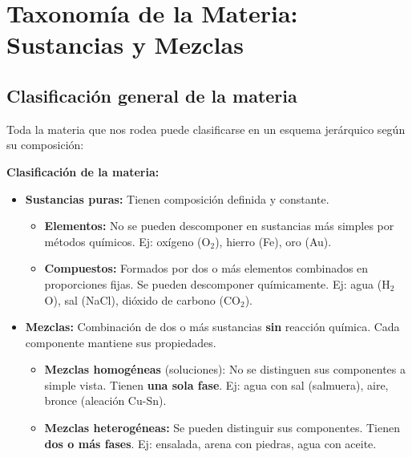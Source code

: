 \documentclass[12pt, letterpaper]{article}
\begin{document}
\section{Taxonomía de la Materia: Sustancias y Mezclas}

\subsection{Clasificación general de la materia}

Toda la materia que nos rodea puede clasificarse en un esquema jerárquico según su composición:

\begin{cuadroteoria}
  \textbf{Clasificación de la materia:}
  \begin{itemize}[leftmargin=*]
    \item \textbf{Sustancias puras:} Tienen composición definida y constante.
          \begin{itemize}
            \item \textbf{Elementos:} No se pueden descomponer en sustancias más simples por métodos químicos. Ej: oxígeno (O$_2$), hierro (Fe), oro (Au).
            \item \textbf{Compuestos:} Formados por dos o más elementos combinados en proporciones fijas. Se pueden descomponer químicamente. Ej: agua (H$_2$O), sal (NaCl), dióxido de carbono (CO$_2$).
          \end{itemize}

    \item \textbf{Mezclas:} Combinación de dos o más sustancias \textbf{sin} reacción química. Cada componente mantiene sus propiedades.
          \begin{itemize}
            \item \textbf{Mezclas homogéneas} (soluciones): No se distinguen sus componentes a simple vista. Tienen \textbf{una sola fase}. Ej: agua con sal (salmuera), aire, bronce (aleación Cu-Sn).
            \item \textbf{Mezclas heterogéneas:} Se pueden distinguir sus componentes. Tienen \textbf{dos o más fases}. Ej: ensalada, arena con piedras, agua con aceite.
          \end{itemize}
  \end{itemize}
\end{cuadroteoria}
\end{document}
